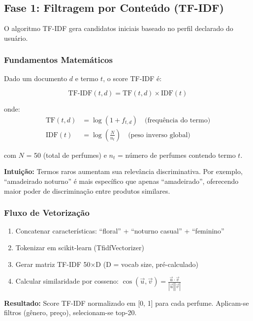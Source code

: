 \documentclass[12pt,a4paper]{article}
\begin{document}
\subsection{Fase 1: Filtragem por Conteúdo (TF-IDF)}

O algoritmo TF-IDF gera candidatos iniciais baseado no perfil declarado do usuário.

\subsubsection{Fundamentos Matemáticos}

Dado um documento $d$ e termo $t$, o score TF-IDF é:

\begin{equation}
\text{TF-IDF}(t, d) = \text{TF}(t, d) \times \text{IDF}(t)
\end{equation}

onde:
\begin{align}
\text{TF}(t, d) &= \log(1 + f_{t,d}) \quad \text{(frequência do termo)} \\
\text{IDF}(t) &= \log\left(\frac{N}{n_t}\right) \quad \text{(peso inverso global)}
\end{align}

com $N$ = 50 (total de perfumes) e $n_t$ = número de perfumes contendo termo $t$.

\textbf{Intuição:} Termos raros aumentam sua relevância discriminativa. Por exemplo, ``amadeirado noturno'' é mais específico que apenas ``amadeirado'', oferecendo maior poder de discriminação entre produtos similares.

\subsubsection{Fluxo de Vetorização}

\begin{enumerate}
    \item Concatenar características: ``floral'' + ``noturno casual'' + ``feminino''
    \item Tokenizar em scikit-learn (TfidfVectorizer)
    \item Gerar matriz TF-IDF 50×D (D = vocab size, pré-calculado)
    \item Calcular similaridade por cosseno: $\cos(\vec{u}, \vec{v}) = \frac{\vec{u} \cdot \vec{v}}{|\vec{u}||\vec{v}|}$
\end{enumerate}

\textbf{Resultado:} Score TF-IDF normalizado em [0, 1] para cada perfume. Aplicam-se filtros (gênero, preço), selecionam-se top-20.
\end{document}
